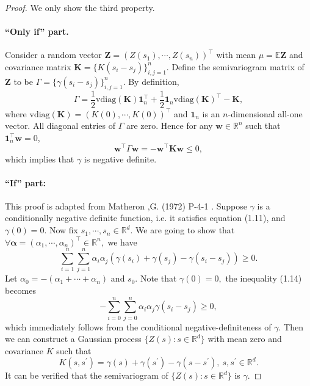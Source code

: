 \documentclass{article}
\begin{document}
\begin{proof}
	We only show the third property. 
	\paragraph{``Only if'' part.} Consider a random vector $\mathbf{Z} = \left(Z(s_1),\cdots,Z(s_n)\right)^\top$ with mean $\mu=\mathbb{E}\mathbf{Z}$ and covariance matrix $\mathbf{K}=\lbrace K(s_i-s_j)\rbrace_{i,j=1}^n$. Define the semivariogram matrix of $\mathbf{Z}$ to be $\Gamma = \lbrace\gamma(s_i-s_j)\rbrace_{i,j=1}^n$. By definition,
	\begin{equation*}
		\Gamma = \frac{1}{2}\mathrm{vdiag}(\mathbf{K})\mathbf{1}_n^\top + \frac{1}{2}\mathbf{1}_n\mathrm{vdiag}(\mathbf{K})^\top  - \mathbf{K},\tag{1.12}
	\end{equation*}
	where $\mathrm{vdiag}(\mathbf{K}) = (K(0),\cdots,K(0))^\top$ and $\mathbf{1}_n$ is an $n$-dimensional all-one vector. All diagonal entries of $\Gamma$ are zero. Hence for any $\mathbf{w}\in\mathbb{R}^n$ such that $\mathbf{1}_n^\top\mathbf{w}=0$,
	\begin{equation*}
		\mathbf{w}^\top\Gamma\mathbf{w} = -\mathbf{w}^\top\mathbf{Kw} \leq 0,\tag{1.13}
	\end{equation*}
	which implies that $\gamma$ is negative definite.
	\paragraph{``If'' part:} This proof is adapted from Matheron ,G. (1972) P-4-1 \cite{MG}. Suppose $\gamma$ is a conditionally negative definite function, i.e. it satisfies equation (1.11), and $\gamma(0)=0$. Now fix $s_1,\cdots,s_n\in\mathbb{R}^d.$ We are going to show that $\forall \boldsymbol{\alpha}=(\alpha_1,\cdots,\alpha_n)^\top\in\mathbb{R}^n,$ we have
	\begin{equation*}
		\sum_{i=1}^n\sum_{j=1}^n\alpha_i\alpha_j\left(\gamma(s_i)+\gamma(s_j)-\gamma(s_i-s_j)\right)\geq 0.\tag{1.14}
	\end{equation*}
    Let $\alpha_0 = -(\alpha_1+\cdots+\alpha_n)$ and $s_0.$ Note that $\gamma(0)=0,$ the inequality (1.14) becomes
    \begin{equation*}
    	-\sum_{i=0}^n\sum_{j=0}^n\alpha_i\alpha_j\gamma(s_i-s_j)\geq 0,\tag{1.15}
    \end{equation*}
    which immediately follows from the conditional negative-definiteness of $\gamma.$ Then we can construct a Gaussian process $\{Z(s):s\in\mathbb{R}^d\}$ with mean zero and covariance $K$ such that
    \begin{equation*}
    	K(s,s^\prime) = \gamma(s) + \gamma(s^\prime) - \gamma(s-s^\prime),\ s,s^\prime\in\mathbb{R}^d.\tag{1.16}
    \end{equation*}
    It can be verified that the semivariogram of $\{Z(s):s\in\mathbb{R}^d\}$ is $\gamma.$
\end{proof}
\end{document}
